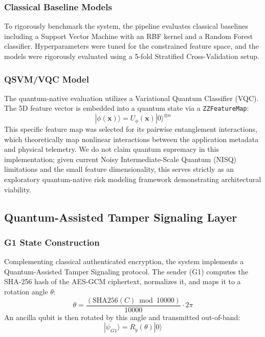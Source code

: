 \documentclass[conference]{IEEEtran}
\begin{document}
\subsubsection{Classical Baseline Models}
To rigorously benchmark the system, the pipeline evaluates classical baselines including a Support Vector Machine with an RBF kernel and a Random Forest classifier. Hyperparameters were tuned for the constrained feature space, and the models were rigorously evaluated using a 5-fold Stratified Cross-Validation setup.

\subsubsection{QSVM/VQC Model}
The quantum-native evaluation utilizes a Variational Quantum Classifier (VQC). The 5D feature vector is embedded into a quantum state via a \texttt{ZZFeatureMap}:
\begin{equation}
|\phi(\mathbf{x})\rangle = U_\phi(\mathbf{x})|0\rangle^{\otimes n}
\end{equation}
This specific feature map was selected for its pairwise entanglement interactions, which theoretically map nonlinear interactions between the application metadata and physical telemetry. We do not claim quantum supremacy in this implementation; given current Noisy Intermediate-Scale Quantum (NISQ) limitations and the small feature dimensionality, this serves strictly as an exploratory quantum-native risk modeling framework demonstrating architectural viability.

\subsection{Quantum-Assisted Tamper Signaling Layer}

\subsubsection{G1 State Construction}
Complementing classical authenticated encryption, the system implements a Quantum-Assisted Tamper Signaling protocol. The sender (G1) computes the SHA-256 hash of the AES-GCM ciphertext, normalizes it, and maps it to a rotation angle $\theta$:
\begin{equation}
\theta = \frac{(\mathrm{SHA256}(C) \bmod 10000)}{10000} \cdot 2\pi
\end{equation}
An ancilla qubit is then rotated by this angle and transmitted out-of-band:
\begin{equation}
|\psi_{G1}\rangle = R_y(\theta)|0\rangle
\end{equation}
\end{document}
